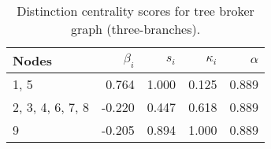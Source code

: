 \begin{table}
\centering
\caption{\label{tab:tree3}Distinction centrality scores for tree broker graph (three-branches).}
\centering
\begin{tabular}[t]{lrrrr}
\toprule
Nodes & $\beta_i$ & $s_i$ & $\kappa_i$ & $\alpha$\\
\midrule
1, 5 & 0.764 & 1.000 & 0.125 & 0.889\\
2, 3, 4, 6, 7, 8 & -0.220 & 0.447 & 0.618 & 0.889\\
9 & -0.205 & 0.894 & 1.000 & 0.889\\
\bottomrule
\end{tabular}
\end{table}
